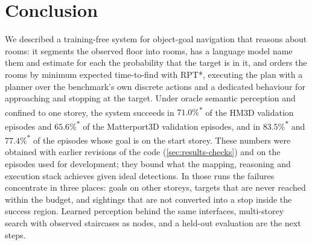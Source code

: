 \documentclass[10pt]{article}
\newcommand{\oldrev}{\textsuperscript{$\ast$}}
\begin{document}
\section{Conclusion}\label{sec:conclusion}
We described a training-free system for object-goal navigation that reasons
about rooms: it segments the observed floor into rooms, has a language model
name them and estimate for each the probability that the target is in it,
and orders the rooms by minimum expected time-to-find with RPT*,
executing the plan with a planner over the benchmark's own discrete actions and
a dedicated behaviour for approaching and stopping at the target. Under oracle
semantic perception and confined to one storey, the system succeeds in
$71.0\%$\oldrev{} of the HM3D validation episodes and $65.6\%$\oldrev{} of the
Matterport3D validation episodes, and in $83.5\%$\oldrev{} and
$77.4\%$\oldrev{} of the episodes whose goal is on the start storey. These
numbers were obtained with earlier revisions of the code
(\cref{sec:results-checks}) and on the episodes used for development; they
bound what the mapping, reasoning and execution stack achieves given ideal
detections. In those runs the failures concentrate in three places: goals on
other storeys, targets that are never reached within the budget, and
sightings that are not converted into a stop inside the success region.
Learned perception behind the same interfaces, multi-storey search with
observed staircases as nodes, and a held-out evaluation are the next steps.
\end{document}

